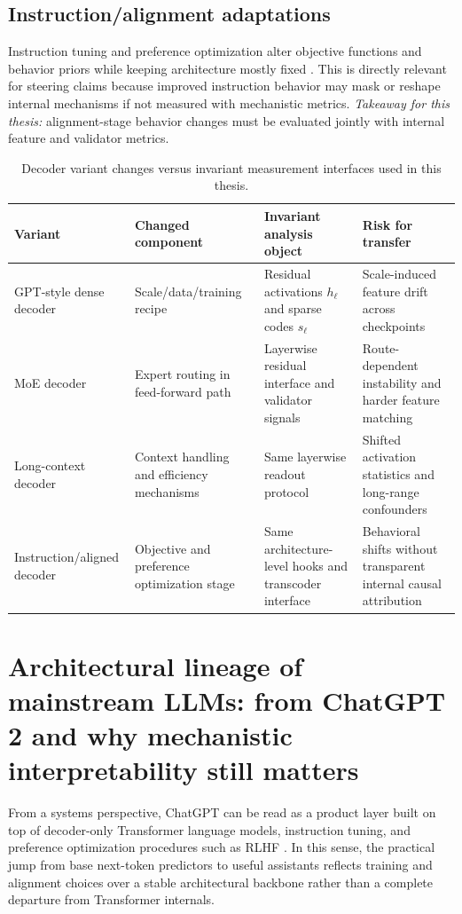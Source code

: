 \documentclass[../ppgc-tese.tex]{subfiles}
\begin{document}
\subsection{Instruction/alignment adaptations}
Instruction tuning and preference optimization alter objective functions and behavior priors while keeping architecture mostly fixed \cite{ouyang2022instructgpt,bai2022constitutional,wei2022chainofthought,rafailov2023dpo}. This is directly relevant for steering claims because improved instruction behavior may mask or reshape internal mechanisms if not measured with mechanistic metrics.
\textit{Takeaway for this thesis:} alignment-stage behavior changes must be evaluated jointly with internal feature and validator metrics.

\begin{table}[ht]
\centering
\small
\begin{tabular}{p{}p{}p{}p{}}
\hline
\textbf{Variant} & \textbf{Changed component} & \textbf{Invariant analysis object} & \textbf{Risk for transfer} \\
\hline
GPT-style dense decoder & Scale/data/training recipe & Residual activations $h_\ell$ and sparse codes $s_\ell$ & Scale-induced feature drift across checkpoints \\
MoE decoder & Expert routing in feed-forward path & Layerwise residual interface and validator signals & Route-dependent instability and harder feature matching \\
Long-context decoder & Context handling and efficiency mechanisms & Same layerwise readout protocol & Shifted activation statistics and long-range confounders \\
Instruction/aligned decoder & Objective and preference optimization stage & Same architecture-level hooks and transcoder interface & Behavioral shifts without transparent internal causal attribution \\
\hline
\end{tabular}
\caption{Decoder variant changes versus invariant measurement interfaces used in this thesis.}
\label{tab:variant-invariant-map}
\end{table}

\section{Architectural lineage of mainstream LLMs: from ChatGPT 2 and why mechanistic interpretability still matters}
\label{sec:arch-lineage-chatgpt}
From a systems perspective, ChatGPT can be read as a product layer built on top of decoder-only Transformer language models, instruction tuning, and preference optimization procedures such as RLHF \cite{vaswani2017attention,ouyang2022instructgpt,christiano2017rlhf,openai2023gpt4}. In this sense, the practical jump from base next-token predictors to useful assistants reflects training and alignment choices over a stable architectural backbone rather than a complete departure from Transformer internals.
\end{document}
